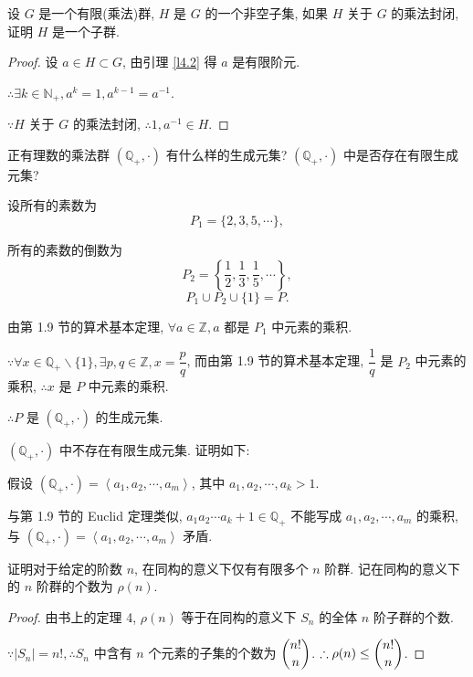 \documentclass[color=black,device=normal,lang=cn,mode=geye]{elegantnote}
\begin{document}
\begin{exercise}\label{ex2.15}
    设 $G$ 是一个有限(乘法)群, $H$ 是 $G$ 的一个非空子集, 如果 $H$ 关于 $G$ 的乘法封闭, 证明 $H$ 是一个子群.
\end{exercise}
\begin{proof}
    设 $a\in H\subset G$, 由引理 \ref{l4.2} 得 $a$ 是有限阶元.

    $\therefore\exists k\in\mathbb{N}_+,a^k=1,a^{k-1}=a^{-1}$.

    $\because H$ 关于 $G$ 的乘法封闭, $\therefore1,a^{-1}\in H$.
\end{proof}
\begin{exercise}%
    正有理数的乘法群 $(\mathbb{Q}_+,\cdot)$ 有什么样的生成元集? $(\mathbb{Q}_+,\cdot)$ 中是否存在有限生成元集?
\end{exercise}
\begin{solution}
    设所有的素数为
    \[P_1=\{2,3,5,\cdots\},\]

    所有的素数的倒数为
    \[P_2=\left\{\dfrac{1}{2},\dfrac{1}{3},\dfrac{1}{5},\cdots\right\},\]
    \[P_1\cup P_2\cup\{1\}=P.\]

    由第 1.9 节的算术基本定理, $\forall a\in\mathbb{Z},a$ 都是 $P_1$ 中元素的乘积.

    $\because\forall x\in\mathbb{Q}_+\backslash\{1\},\exists p,q\in\mathbb{Z},x=\dfrac{p}{q}$, 而由第 1.9 节的算术基本定理, $\dfrac{1}{q}$ 是 $P_2$ 中元素的乘积, $\therefore x$ 是 $P$ 中元素的乘积.

    $\therefore P$ 是 $(\mathbb{Q}_+,\cdot)$ 的生成元集.

    $(\mathbb{Q}_+,\cdot)$ 中不存在有限生成元集. 证明如下:

    假设 $(\mathbb{Q}_+,\cdot)=\left<a_1,a_2,\cdots,a_m\right>$, 其中 $a_1,a_2,\cdots,a_k>1$.

    与第 1.9 节的 Euclid 定理类似, $a_1a_2\cdots a_k+1\in\mathbb{Q}_+$ 不能写成 $a_1,a_2,\cdots,a_m$ 的乘积, 与 $(\mathbb{Q}_+,\cdot)=\left<a_1,a_2,\cdots,a_m\right>$ 矛盾.
\end{solution}
\begin{exercise}%
    证明对于给定的阶数 $n$, 在同构的意义下仅有有限多个 $n$ 阶群. 记在同构的意义下的 $n$ 阶群的个数为 $\rho(n)$.
\end{exercise}
\begin{proof}
    由书上的定理 4, $\rho(n)$ 等于在同构的意义下 $S_n$ 的全体 $n$ 阶子群的个数.

    $\because|S_n|=n!,\therefore S_n$ 中含有 $n$ 个元素的子集的个数为 $\dbinom{n!}{n}$. $\therefore\rho(n)\leq\dbinom{n!}{n}$.
\end{proof}
\end{document}
